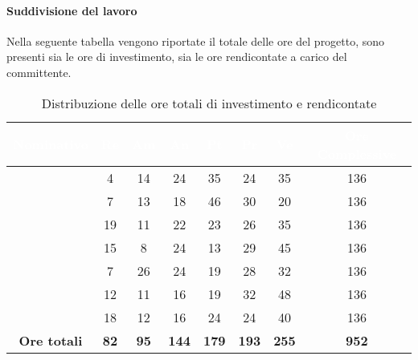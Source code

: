 \paragraph{Suddivisione del lavoro}
Nella seguente tabella vengono riportate il totale delle ore del progetto, sono presenti sia le ore di investimento, sia le ore rendicontate a carico del committente.
\begin{table}[H]
	\begin{center}
		\begin{tabular}{ |c c c c c c c c| }
		\rowcolor{darkblue} 
		\textcolor{white}{\textbf{Nominativo}} & \textcolor{white}{\textbf{Re}} & \textcolor{white}{\textbf{Am}} & \textcolor{white}{\textbf{An}} & \textcolor{white}{\textbf{Pt}} & \textcolor{white}{\textbf{Pr}} & \textcolor{white}{\textbf{Ve}} & \textcolor{white}{\textbf{Ore Complessive}} \\ \hline
		\BL 	& 4  	& 14  	& 24 	& 35 	& 24 	& 35 	& 136 \\ \hline
		\FF 	& 7 	& 13 	& 18 	& 46 	& 30 	& 20 	& 136 \\ \hline
		\MM 	& 19  	& 11  	& 22 	& 23 	& 26 	& 35  	& 136 \\ \hline
		\PC 	& 15 	& 8  	& 24 	& 13 	& 29	& 45 	& 136 \\ \hline
		\TG 	& 7  	& 26 	& 24 	& 19 	& 28 	& 32 	& 136 \\ \hline
		\TL 	& 12  	& 11 	& 16 	& 19 	& 32 	& 48 	& 136 \\ \hline
		\VD 	& 18  	& 12  	& 16 	& 24 	& 24 	& 40 	& 136 \\ \hline
		\textbf{Ore totali} & \textbf{82} & \textbf{95} & \textbf{144} & \textbf{179} & \textbf{193} & \textbf{255} & \textbf{952} \\ \hline
		\end{tabular}
	\caption{Distribuzione delle ore totali di investimento e rendicontate}
	\end{center}
\end{table}

